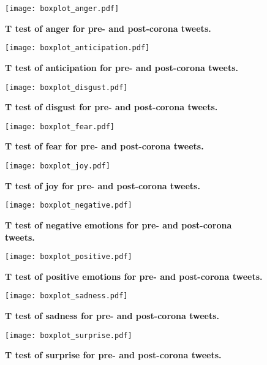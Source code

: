 \documentclass[12pt]{article}
\begin{document}
\begin{figure}[H]
\caption{\textbf{T test of anger for pre- and post-corona tweets.}}
\texttt{[image: boxplot\_anger.pdf]}

\end{figure}

\begin{figure}[H]
\caption{\textbf{T test of anticipation for pre- and post-corona tweets.}}
\texttt{[image: boxplot\_anticipation.pdf]}

\end{figure}

\begin{figure}[H]
\caption{\textbf{T test of disgust for pre- and post-corona tweets.}}
\texttt{[image: boxplot\_disgust.pdf]}

\end{figure}

\begin{figure}[H]
\caption{\textbf{T test of fear for pre- and post-corona tweets.}}
\texttt{[image: boxplot\_fear.pdf]}

\end{figure}

\begin{figure}[H]
\caption{\textbf{T test of joy for pre- and post-corona tweets.}}
\texttt{[image: boxplot\_joy.pdf]}

\end{figure}

\begin{figure}[H]
\caption{\textbf{T test of negative emotions for pre- and post-corona tweets.}}
\texttt{[image: boxplot\_negative.pdf]}

\end{figure}

\begin{figure}[H]
\caption{\textbf{T test of positive emotions for pre- and post-corona tweets.}}
\texttt{[image: boxplot\_positive.pdf]}

\end{figure}

\begin{figure}[H]
\caption{\textbf{T test of sadness for pre- and post-corona tweets.}}
\texttt{[image: boxplot\_sadness.pdf]}

\end{figure}

\begin{figure}[H]
\caption{\textbf{T test of surprise for pre- and post-corona tweets.}}
\texttt{[image: boxplot\_surprise.pdf]}

\end{figure}
\end{document}
